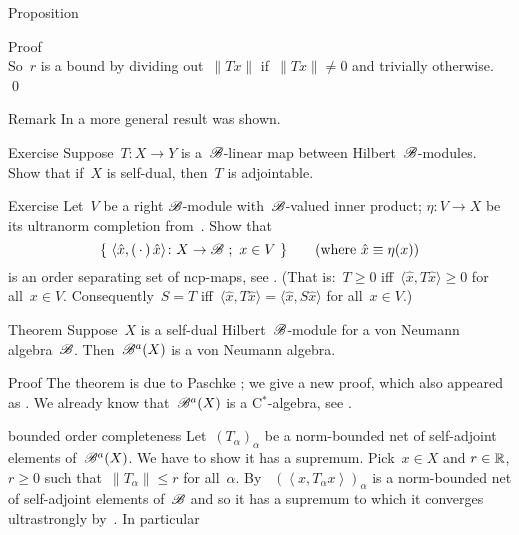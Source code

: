 \begin{parsec}
\begin{point}{Proposition}
\begin{point}{Proof}
\begin{equation*}
\end{equation*}
So~$r$ is a bound
    by dividing out~$\| T x \|$
    if~$\| Tx \| \neq 0$
    and trivially otherwise.  \qed
\end{point}
\begin{point}{Remark}%
In  a more general result was shown.
\end{point}
\end{point}
\begin{point}{Exercise}%
Suppose~$T\colon X \to Y$ is a~$\mathscr{B}$-linear map between
    Hilbert~$\mathscr{B}$-modules.
Show that if~$X$ is self-dual,
    then~$T$ is adjointable.
\end{point}
\begin{point}{Exercise}%
Let~$V$ be a right $\mathscr{B}$-module with~$\mathscr{B}$-valued inner product;
    $\eta\colon V \to X$ be its ultranorm completion
    from~.
Show that
\begin{equation*}
    \{\ \langle \hat{x}, (\,\cdot\,)\, \hat{x}\rangle \colon X \to \mathscr{B} \ ;\ x \in V\  \} \qquad \text{(where $\hat{x} \equiv \eta(x)$)}
\end{equation*}
is an order separating set of ncp-maps, see .
    (That is:~$T \geq 0$ iff~$\langle \hat{x}, T \hat{x}\rangle \geq 0$
    for all~$x \in V$.
    Consequently~$S = T$ iff~$\langle \hat{x}, T \hat{x} \rangle 
    = \langle \hat{x}, S \hat{x} \rangle$ for all~$x \in V$.)
\end{point}
\begin{point}{Theorem}%
Suppose~$X$ is a self-dual Hilbert~$\mathscr{B}$-module
    for a von Neumann algebra~$\mathscr{B}$.
Then~$\mathscr{B}^a(X)$ is a von Neumann algebra.
\begin{point}{Proof}%
The theorem is due to Paschke \cite[Prop.~3.10]{paschke};
    we give a new proof, which also appeared as .
We already know that~$\mathscr{B}^a(X)$ is a C$^*$-algebra, see .
\begin{point}{bounded order completeness}%
Let~$(T_\alpha)_\alpha$ be a norm-bounded net of self-adjoint elements
    of~$\mathscr{B}^a(X)$.  We have to show it has a supremum.
Pick~$x\in X$ and  $r\in \mathbb{R}$, $r\geq0 $
such that~$\|T_\alpha\| \leq r$ for all~$\alpha$.
By ~$(\left<x,T_\alpha x\right>)_\alpha$
    is a norm-bounded net of self-adjoint elements of~$\mathscr{B}$
    and so it has a supremum to which
    it converges ultrastrongly by~.
In particular
\begin{equation*}

\end{equation*}
\end{point}
\end{point}
\end{point}
\end{parsec}
